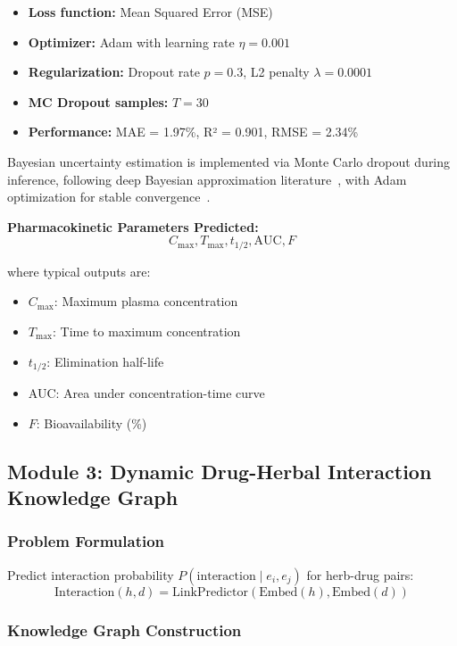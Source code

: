 \documentclass[11pt,a4paper]{article}
\begin{document}
\begin{itemize}
    \item \textbf{Loss function:} Mean Squared Error (MSE)
    \item \textbf{Optimizer:} Adam with learning rate $\eta = 0.001$
    \item \textbf{Regularization:} Dropout rate $p = 0.3$, L2 penalty $\lambda = 0.0001$
    \item \textbf{MC Dropout samples:} $T = 30$
    \item \textbf{Performance:} MAE = 1.97\%, R² = 0.901, RMSE = 2.34\%
\end{itemize}

Bayesian uncertainty estimation is implemented via Monte Carlo dropout during inference, following deep Bayesian approximation literature~\cite{gal2016}, with Adam optimization for stable convergence~\cite{kingma2014}.

\textbf{Pharmacokinetic Parameters Predicted:}
\[
C_{\max}, T_{\max}, t_{1/2}, \text{AUC}, F
\]

where typical outputs are:
\begin{itemize}
    \item $C_{\max}$: Maximum plasma concentration
    \item $T_{\max}$: Time to maximum concentration  
    \item $t_{1/2}$: Elimination half-life
    \item AUC: Area under concentration-time curve
    \item $F$: Bioavailability (\%)
\end{itemize}

\subsection{Module 3: Dynamic Drug-Herbal Interaction Knowledge Graph}

\subsubsection{Problem Formulation}

Predict interaction probability $P(\text{interaction} \mid e_i, e_j)$ for herb-drug pairs:
\[
\text{Interaction}(h, d) = \text{LinkPredictor}(\text{Embed}(h), \text{Embed}(d))
\]

\subsubsection{Knowledge Graph Construction}
\end{document}
